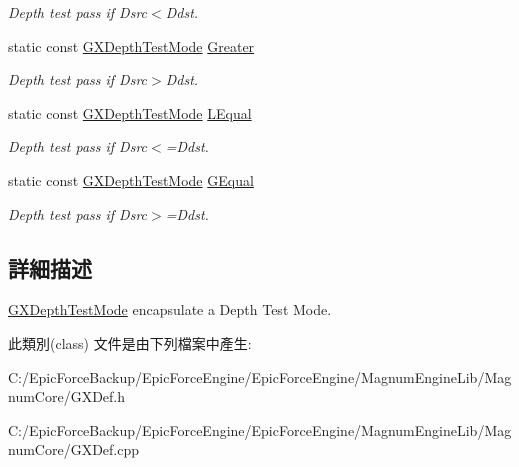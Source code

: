 \begin{DoxyCompactItemize}
\begin{DoxyCompactList}\small\item\em Depth test pass if Dsrc$<$Ddst. \end{DoxyCompactList}\item 
static const \hyperlink{class_magnum_1_1_g_x_depth_test_mode}{G\+X\+Depth\+Test\+Mode} \hyperlink{class_magnum_1_1_g_x_depth_test_mode_a1f0c29b6a1848b5b1be2d1e0a799bfcc}{Greater}\hypertarget{class_magnum_1_1_g_x_depth_test_mode_a1f0c29b6a1848b5b1be2d1e0a799bfcc}{}\label{class_magnum_1_1_g_x_depth_test_mode_a1f0c29b6a1848b5b1be2d1e0a799bfcc}

\begin{DoxyCompactList}\small\item\em Depth test pass if Dsrc$>$Ddst. \end{DoxyCompactList}\item 
static const \hyperlink{class_magnum_1_1_g_x_depth_test_mode}{G\+X\+Depth\+Test\+Mode} \hyperlink{class_magnum_1_1_g_x_depth_test_mode_a5e75741d8bb06a766c0e5f049f830cf1}{L\+Equal}\hypertarget{class_magnum_1_1_g_x_depth_test_mode_a5e75741d8bb06a766c0e5f049f830cf1}{}\label{class_magnum_1_1_g_x_depth_test_mode_a5e75741d8bb06a766c0e5f049f830cf1}

\begin{DoxyCompactList}\small\item\em Depth test pass if Dsrc$<$=Ddst. \end{DoxyCompactList}\item 
static const \hyperlink{class_magnum_1_1_g_x_depth_test_mode}{G\+X\+Depth\+Test\+Mode} \hyperlink{class_magnum_1_1_g_x_depth_test_mode_adf347ffbb817059204969d496cd8a477}{G\+Equal}\hypertarget{class_magnum_1_1_g_x_depth_test_mode_adf347ffbb817059204969d496cd8a477}{}\label{class_magnum_1_1_g_x_depth_test_mode_adf347ffbb817059204969d496cd8a477}

\begin{DoxyCompactList}\small\item\em Depth test pass if Dsrc$>$=Ddst. \end{DoxyCompactList}\end{DoxyCompactItemize}


\subsection{詳細描述}
\hyperlink{class_magnum_1_1_g_x_depth_test_mode}{G\+X\+Depth\+Test\+Mode} encapsulate a Depth Test Mode. 

此類別(class) 文件是由下列檔案中產生\+:\begin{DoxyCompactItemize}
\item 
C\+:/\+Epic\+Force\+Backup/\+Epic\+Force\+Engine/\+Epic\+Force\+Engine/\+Magnum\+Engine\+Lib/\+Magnum\+Core/G\+X\+Def.\+h\item 
C\+:/\+Epic\+Force\+Backup/\+Epic\+Force\+Engine/\+Epic\+Force\+Engine/\+Magnum\+Engine\+Lib/\+Magnum\+Core/G\+X\+Def.\+cpp\end{DoxyCompactItemize}
